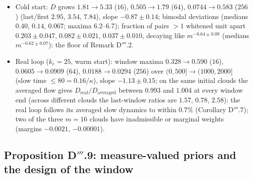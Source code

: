 \begin{itemize}
    all 12; splitting margins positive in 11 of 12 ($+0.0006$ to $+0.0050$), negative ($-0.0022$) for $m=16$, seed 3
    (weights $(9,4,3)/16$: a saddle, left later by particle migration --- review round 9); per-cluster displacements
    along $S_k(w^m-w^M)$ with cosines 0.92--1.000 and norms within 0.8--20\%.
  \item Cold start: $D$ grows $1.81\to5.33$ ($16$), $0.505\to1.79$ ($64$), $0.0744\to0.583$ ($256$) (last/first
    $2.95$, $3.54$, $7.84$), slope $-0.87\pm0.14$; bimodal deviations (medians $0.40$, $0.14$, $0.067$; maxima
    6.2--6.7); fraction of pairs $>1$ whitened unit apart $0.203\pm0.047$, $0.082\pm0.021$, $0.037\pm0.010$, decaying
    like $m^{-0.64\pm0.08}$ (medians $m^{-0.62\pm0.07}$): the floor of Remark D$'''$.2.
  \item Real loop ($k_e=25$, warm start): window maxima $0.328\to0.590$ ($16$), $0.0605\to0.0909$ ($64$),
    $0.0188\to0.0294$ ($256$) over $(0,500]\to(1000,2000]$ (slow time $\le80=0.16/\kappa$), slope $-1.13\pm0.15$; on
    the same initial clouds the averaged flow gives $D_{\mathrm{real}}/D_{\mathrm{averaged}}$ between $0.993$ and
    $1.004$ at every window end (across different clouds the last-window ratios are $1.57$, $0.78$, $2.58$): the real
    loop follows its averaged slow dynamics to within 0.7\% (Corollary D$'''$.7); two of the three $m=16$ clouds have
    inadmissible or marginal weights (margins $-0.0021$, $-0.00001$).
\end{itemize}

\subsection{Proposition D\texorpdfstring{$'''$}{'''}.9: measure-valued priors and the design of the window}

